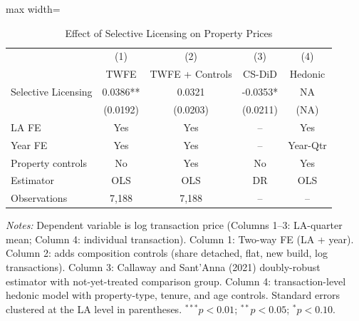 \begin{table}[t]
\centering
\caption{Effect of Selective Licensing on Property Prices}
\label{tab:main}
\begin{adjustbox}{max width=\textwidth}
\begin{tabular}{lcccc}
\toprule
 & (1) & (2) & (3) & (4) \\
 & TWFE & TWFE + Controls & CS-DiD & Hedonic \\
\midrule
Selective Licensing & 0.0386** & 0.0321 & -0.0353* & NA \\
  & (0.0192) & (0.0203) & (0.0211) & (NA) \\
\midrule
LA FE & Yes & Yes & -- & Yes \\
Year FE & Yes & Yes & -- & Year-Qtr \\
Property controls & No & Yes & No & Yes \\
Estimator & OLS & OLS & DR & OLS \\
Observations & 7,188 & 7,188 & -- & -- \\
\bottomrule
\end{tabular}
\end{adjustbox}
\begin{tablenotes}[flushleft]
\small
\item \textit{Notes:} Dependent variable is log transaction price (Columns 1--3: LA-quarter mean; Column 4: individual transaction). Column 1: Two-way FE (LA + year). Column 2: adds composition controls (share detached, flat, new build, log transactions). Column 3: Callaway and Sant'Anna (2021) doubly-robust estimator with not-yet-treated comparison group. Column 4: transaction-level hedonic model with property-type, tenure, and age controls. Standard errors clustered at the LA level in parentheses. $^{***}p<0.01$; $^{**}p<0.05$; $^{*}p<0.10$.
\end{tablenotes}
\end{table}
